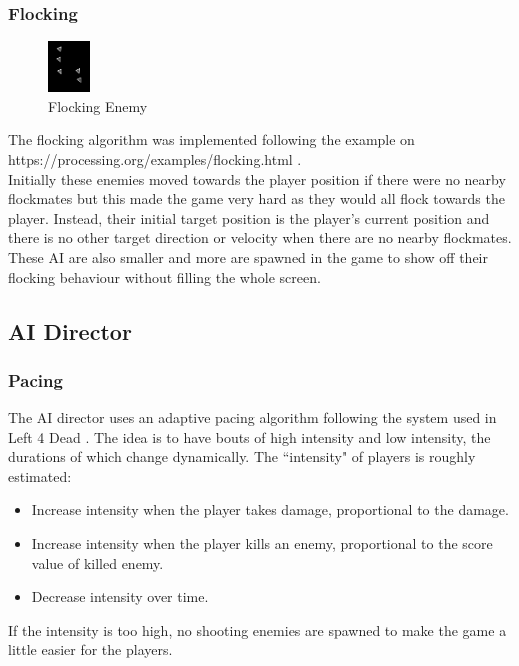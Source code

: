 \documentclass{article}
\newcommand{\n}[0]{\\[\baselineskip]}
\begin{document}
\subsubsection{Flocking}
\begin{figure}[H]
\centering
\includegraphics[width=0.1\textwidth, keepaspectratio]{imgs/FlockingEnemy.png}
\caption{Flocking Enemy}
\end{figure}
\noindent
The flocking algorithm was implemented following the example on https://processing.org/examples/flocking.html \cite{flocking}. 
\n
Initially these enemies moved towards the player position if there were no nearby flockmates but this made the game very hard as they would all flock towards the player. Instead, their initial target position is the player's current position and there is no other target direction or velocity when there are no nearby flockmates. 
\n
These AI are also smaller and more are spawned in the game to show off their flocking behaviour without filling the whole screen.

\subsection{AI Director}
\subsubsection{Pacing}
The AI director uses an adaptive pacing algorithm following the system used in Left 4 Dead \cite{l4d}. The idea is to have bouts of high intensity and low intensity, the durations of which change dynamically. The ``intensity" of players is roughly estimated:
\begin{itemize}
\item Increase intensity when the player takes damage, proportional to the damage.
\item Increase intensity when the player kills an enemy, proportional to the score value of killed enemy.
\item Decrease intensity over time. 
\end{itemize}
\noindent
If the intensity is too high, no shooting enemies are spawned to make the game a little easier for the players.
\end{document}
